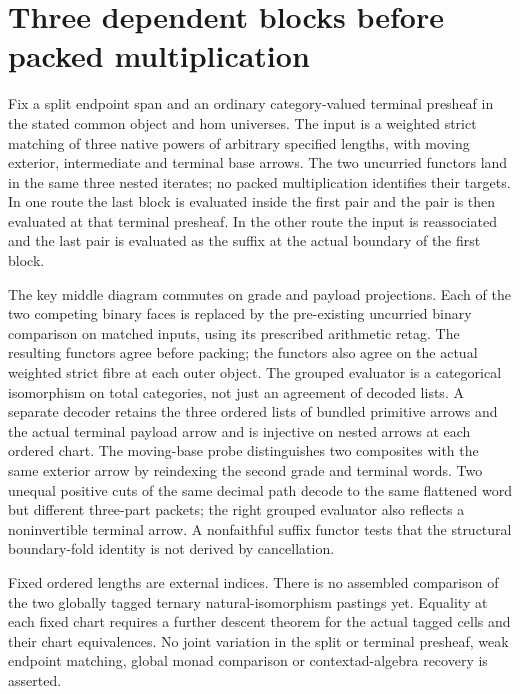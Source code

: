 \documentclass{article}
\begin{document}
\section*{Three dependent blocks before packed multiplication}
Fix a split endpoint span and an ordinary category-valued terminal presheaf in the stated common object and hom universes. The input is a weighted strict matching of three native powers of arbitrary specified lengths, with moving exterior, intermediate and terminal base arrows. The two uncurried functors land in the same three nested iterates; no packed multiplication identifies their targets. In one route the last block is evaluated inside the first pair and the pair is then evaluated at that terminal presheaf. In the other route the input is reassociated and the last pair is evaluated as the suffix at the actual boundary of the first block.
\par The key middle diagram commutes on grade and payload projections. Each of the two competing binary faces is replaced by the pre-existing uncurried binary comparison on matched inputs, using its prescribed arithmetic retag. The resulting functors agree before packing; the functors also agree on the actual weighted strict fibre at each outer object. The grouped evaluator is a categorical isomorphism on total categories, not just an agreement of decoded lists. A separate decoder retains the three ordered lists of bundled primitive arrows and the actual terminal payload arrow and is injective on nested arrows at each ordered chart. The moving-base probe distinguishes two composites with the same exterior arrow by reindexing the second grade and terminal words. Two unequal positive cuts of the same decimal path decode to the same flattened word but different three-part packets; the right grouped evaluator also reflects a noninvertible terminal arrow. A nonfaithful suffix functor tests that the structural boundary-fold identity is not derived by cancellation.
\par Fixed ordered lengths are external indices. There is no assembled comparison of the two globally tagged ternary natural-isomorphism pastings yet. Equality at each fixed chart requires a further descent theorem for the actual tagged cells and their chart equivalences. No joint variation in the split or terminal presheaf, weak endpoint matching, global monad comparison or contextad-algebra recovery is asserted.
\end{document}
